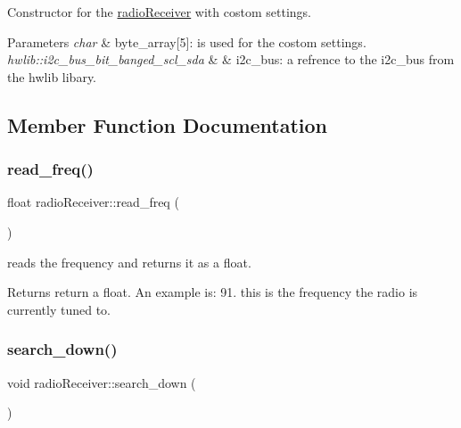 Constructor for the \hyperlink{classradio_receiver}{radio\+Receiver} with costom settings. 


\begin{DoxyParams}{Parameters}
{\em char} & byte\+\_\+array\mbox{[}5\mbox{]}\+: is used for the costom settings. \\
\hline
{\em hwlib\+::i2c\+\_\+bus\+\_\+bit\+\_\+banged\+\_\+scl\+\_\+sda} & \& i2c\+\_\+bus\+: a refrence to the i2c\+\_\+bus from the hwlib libary. \\
\hline
\end{DoxyParams}


\subsection{Member Function Documentation}
\mbox{\label{classradio_receiver_a953b6a00907b39e78f89fe0b335ce520}} 
\subsubsection{\texorpdfstring{read\+\_\+freq()}{read\_freq()}}
{\footnotesize\ttfamily float radio\+Receiver\+::read\+\_\+freq (\begin{DoxyParamCaption}{ }\end{DoxyParamCaption})}



reads the frequency and returns it as a float. 

\begin{DoxyReturn}{Returns}
return a float. An example is\+: 91. this is the frequency the radio is currently tuned to. 
\end{DoxyReturn}
\mbox{\label{classradio_receiver_a18f37c51db68873d0634519ba0cc1cae}} 
\subsubsection{\texorpdfstring{search\+\_\+down()}{search\_down()}}
{\footnotesize\ttfamily void radio\+Receiver\+::search\+\_\+down (\begin{DoxyParamCaption}{ }\end{DoxyParamCaption})}



